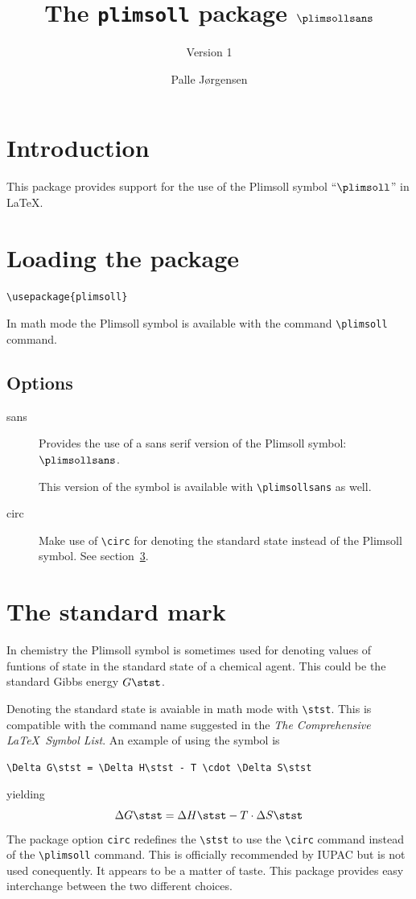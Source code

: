 \documentclass[11pt,english,fleqn,parskip=half]{scrartcl}
\title{The \texttt{plimsoll} package $\plimsollsans$}
\subtitle{Version 1}
\author{Palle Jørgensen}
\begin{document}
\maketitle

\section{Introduction}
\label{sec:introduction}

This package provides support for the use of the Plimsoll symbol
``$\plimsoll$'' in \LaTeX.

\section{Loading the package}
\label{sec:loading-package}
\begin{lstlisting}[language={[latex]tex}]
\usepackage{plimsoll}
\end{lstlisting}
In math mode the Plimsoll symbol is available with the command
\lstinline{\plimsoll} command.

\subsection{Options}
\label{sec:options}
\begin{description}
\item[sans] Provides the use of a sans serif version of the Plimsoll
  symbol: $\plimsollsans$.

  This version of the symbol is available with
  \lstinline|\plimsollsans| as well.
\item[circ] Make use of \lstinline{\circ} for denoting the standard
  state instead of the Plimsoll symbol. See
  section~\ref{sec:standard-mark}.
\end{description}

\section{The standard mark}
\label{sec:standard-mark}

In chemistry the Plimsoll symbol is sometimes used for denoting values
of funtions of state in the standard state of a chemical agent. This
could be the standard Gibbs energy $G\stst$.

Denoting the standard state is avaiable in math mode with
\lstinline{\stst}. This is compatible with the command name suggested
in the \emph{The Comprehensive \LaTeX\ Symbol List}. An example of
using the symbol is
\begin{lstlisting}[language={[latex]tex}]
\Delta G\stst = \Delta H\stst - T \cdot \Delta S\stst 
\end{lstlisting}
yielding
\begin{equation}
  \label{eq:1}
  \Delta G \stst = \Delta H\stst - T \cdot \Delta S\stst 
\end{equation}
The package option \lstinline{circ} redefines the \lstinline{\stst} to
use the \lstinline{\circ} command instead of the \lstinline{\plimsoll}
command. This is officially recommended by IUPAC but is not used
conequently. It appears to be a matter of taste. This package provides
easy interchange between the two different choices.
\end{document}
